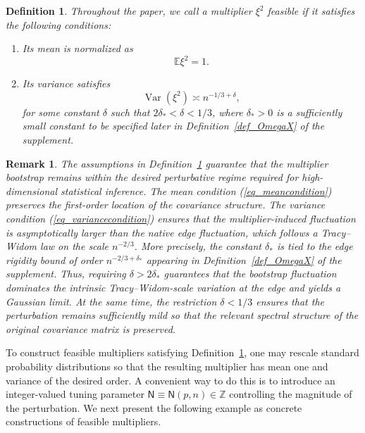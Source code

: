 \documentclass[12pt]{article}
\def\sN{\mathsf N}
\theoremstyle{plain}
\newtheorem{remark}{Remark}[section]
\newtheorem{definition}{Definition}[section]
\numberwithin{equation}{section}
\begin{document}
\begin{definition}\label{defn_feasiblemultiplier}
	\normalfont
	Throughout the paper, we call a multiplier $\xi^2$ \emph{feasible} if it satisfies the following conditions:
	\begin{enumerate}
		\item Its mean is normalized as
		\begin{equation}\label{eq_meancondition}
			\mathbb{E}\xi^2 = 1.
		\end{equation}
		
		\item  Its variance satisfies
		\begin{equation}\label{eq_variancecondition}
			\operatorname{Var}(\xi^2) \asymp n^{-1/3+\delta},
		\end{equation}
		for some constant $\delta$ such that $2\delta_* < \delta < 1/3$, where $\delta_*>0$ is a sufficiently small constant to be specified later in Definition~\ref{def_OmegaX} of the supplement.
	\end{enumerate}
\end{definition}

\begin{remark}
	The assumptions in Definition~\ref{defn_feasiblemultiplier} guarantee that the multiplier bootstrap remains within the desired perturbative regime required for high-dimensional statistical inference. The mean condition (\ref{eq_meancondition}) preserves the first-order location of the covariance structure. The variance condition (\ref{eq_variancecondition}) ensures that the multiplier-induced fluctuation is asymptotically larger than the native edge fluctuation, which follows a Tracy--Widom law on the scale $n^{-2/3}$. More precisely, the constant $\delta_*$ is tied to the edge rigidity bound of order $n^{-2/3+\delta_*}$ appearing in Definition~\ref{def_OmegaX} of the supplement. Thus, requiring $\delta>2\delta_*$ guarantees that the bootstrap fluctuation dominates the intrinsic Tracy--Widom-scale variation at the edge and yields a Gaussian limit. At the same time, the restriction $\delta<1/3$ ensures that the perturbation remains sufficiently mild so that the relevant spectral structure of the original covariance matrix is preserved.
\end{remark}

To construct feasible multipliers satisfying Definition~\ref{defn_feasiblemultiplier}, one may rescale standard probability distributions so that the resulting multiplier has mean one and variance of the desired order. A convenient way to do this is to introduce an integer-valued tuning parameter $\sN \equiv \sN(p,n)\in\mathbb{Z}$ controlling the magnitude of the perturbation. We next present the following example as concrete constructions of feasible multipliers.
\end{document}
